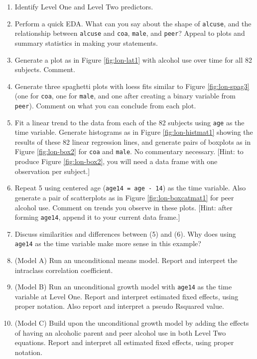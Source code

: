 \documentclass[
]{krantz}
\begin{document}
\begin{enumerate}
  \begin{enumerate}
  \def\labelenumii{\alph{enumii}.}
  \item
    Identify Level One and Level Two predictors.
  \item
    Perform a quick EDA. What can you say about the shape of \texttt{alcuse}, and the relationship between \texttt{alcuse} and \texttt{coa}, \texttt{male}, and \texttt{peer}? Appeal to plots and summary statistics in making your statements.
  \item
    Generate a plot as in Figure \ref{fig:lon-lat1} with alcohol use over time for all 82 subjects. Comment.
  \item
    Generate three spaghetti plots with loess fits similar to Figure \ref{fig:lon-spag3} (one for \texttt{coa}, one for \texttt{male}, and one after creating a binary variable from \texttt{peer}). Comment on what you can conclude from each plot.
  \item
    Fit a linear trend to the data from each of the 82 subjects using \texttt{age} as the time variable. Generate histograms as in Figure \ref{fig:lon-histmat1} showing the results of these 82 linear regression lines, and generate pairs of boxplots as in Figure \ref{fig:lon-box2} for \texttt{coa} and \texttt{male}. No commentary necessary. {[}Hint: to produce Figure \ref{fig:lon-box2}, you will need a data frame with one observation per subject.{]}
  \item
    Repeat 5 using centered age (\texttt{age14\ =\ age\ -\ 14}) as the time variable. Also generate a pair of scatterplots as in Figure \ref{fig:lon-boxcatmat1} for peer alcohol use. Comment on trends you observe in these plots. {[}Hint: after forming \texttt{age14}, append it to your current data frame.{]}
  \item
    Discuss similarities and differences between (5) and (6). Why does using \texttt{age14} as the time variable make more sense in this example?
  \item
    (Model A) Run an unconditional means model. Report and interpret the intraclass correlation coefficient.
  \item
    (Model B) Run an unconditional growth model with \texttt{age14} as the time variable at Level One. Report and interpret estimated fixed effects, using proper notation. Also report and interpret a pseudo Rsquared value.
  \item
    (Model C) Build upon the unconditional growth model by adding the effects of having an alcoholic parent and peer alcohol use in both Level Two equations. Report and interpret all estimated fixed effects, using proper notation.

\end{enumerate}
\end{enumerate}
\end{document}
